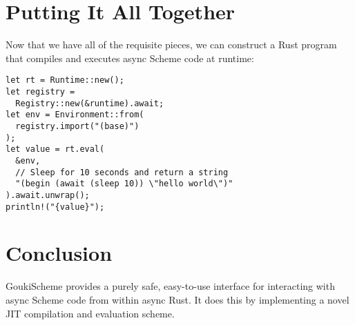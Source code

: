 \documentclass[sigplan,authordraft]{acmart}
\begin{document}
\section{Putting It All Together}

Now that we have all of the requisite pieces, we can construct a Rust program
that compiles and executes async Scheme code at runtime:

\begin{verbatim}
let rt = Runtime::new();
let registry =
  Registry::new(&runtime).await;
let env = Environment::from(
  registry.import("(base)")
);
let value = rt.eval(
  &env,
  // Sleep for 10 seconds and return a string
  "(begin (await (sleep 10)) \"hello world\")"
).await.unwrap();
println!("{value}");
\end{verbatim}

\section{Conclusion}

GoukiScheme provides a purely safe, easy-to-use interface for interacting with
async Scheme code from within async Rust. It does this by implementing a novel
JIT compilation and evaluation scheme. 



\end{document}
